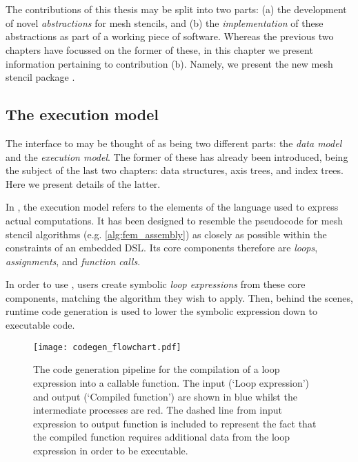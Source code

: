 \documentclass[thesis]{subfiles}
\begin{document}
\chapter{}
\label{chapter:pyop3}

The contributions of this thesis may be split into two parts:
(a) the development of novel \emph{abstractions} for mesh stencils, and
(b) the \emph{implementation} of these abstractions as part of a working piece of software.
Whereas the previous two chapters have focussed on the former of these, in this chapter we present information pertaining to contribution (b).
Namely, we present the new mesh stencil package .

\section{The execution model}

The interface to  may be thought of as being two different parts: the \emph{data model} and the \emph{execution model}.
The former of these has already been introduced, being the subject of the last two chapters: data structures, axis trees, and index trees.
Here we present details of the latter.

In , the execution model refers to the elements of the language used to express actual computations.
It has been designed to resemble the pseudocode for mesh stencil algorithms (e.g. \cref{alg:fem_assembly}) as closely as possible within the constraints of an embedded DSL.
Its core components therefore are \emph{loops}, \emph{assignments}, and \emph{function calls}.

In order to use , users create symbolic \emph{loop expressions} from these core components, matching the algorithm they wish to apply.
Then, behind the scenes, runtime code generation is used to lower the symbolic expression down to executable code.

\begin{figure}
  \centering
  \texttt{[image: codegen\_flowchart.pdf]}
  \caption{
    The code generation pipeline for the compilation of a loop expression into a callable function.
    The input (`Loop expression') and output (`Compiled function') are shown in blue whilst the intermediate processes are red.
    The dashed line from input expression to output function is included to represent the fact that the compiled function requires additional data from the loop expression in order to be executable.
  }
  \label{fig:codegen_flowchart}
\end{figure}
\end{document}
